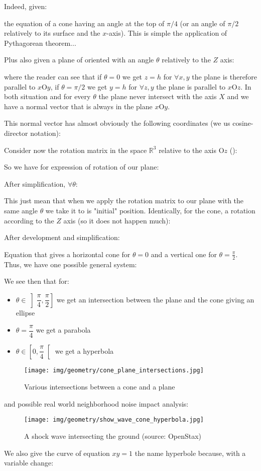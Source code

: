 \begin{enumerate}
		Indeed, given:		 
				
		the equation of a cone having an angle at the top of $\pi/4$ (or an angle of $\pi/2$ relatively to its surface and the $x$-axis). This is simple the application of Pythagorean theorem...
		
		Plus also given a plane of oriented with an angle $\theta$ relatively to the $Z$ axis:
		
		where the reader can see that if $\theta=0$ we get $z=h$ for $\forall x,y$ the plane is therefore parallel to $x\text{O}y$, if $\theta=\pi/2$ we get $y=h$ for $\forall z,y$ the plane is parallel to $x\text{O}z$. In both situation and for every $\theta$ the plane never intersect with the axis $X$ and we have a normal vector that is always in the plane $x\text{O}y$.
		
		This normal vector has almost obviously the following coordinates (we us cosine-director notation):
		
		Consider now the rotation matrix in the space $\mathbb{R}^3$ relative to the axis $\text{O}z$ ():
		
		So we have for expression of rotation of our plane:
		
		After simplification, $\forall \theta$:
		
		This just mean that when we apply the rotation matrix to our plane with the same angle $\theta$ we take it to is "initial" position.
		Identically, for the cone, a rotation according to the $Z$ axis (so it does not happen much):
		
		After development and simplification:
		
		Equation that gives a horizontal cone for $\theta=0$ and a vertical one for $\theta=\frac{\pi}{2}$.
		Thus, we have one possible general system:
		
		We see then that for:
		\begin{itemize}
			\item $\theta \in \left]\dfrac{\pi}{4},\dfrac{\pi}{2}\right]$ we get an intersection between the plane and the cone giving an ellipse
			\item $\theta=\dfrac{\pi}{4}$ we get a parabola
			\item $\theta \in \left[0,\dfrac{\pi}{4}\right[$ we get a hyperbola
		\end{itemize}
		\begin{figure}[H]
			\centering
			\texttt{[image: img/geometry/cone\_plane\_intersections.jpg]}
			\caption{Various intersections between a cone and a plane}
		\end{figure}
		and possible real world neighborhood noise impact analysis:
		\begin{figure}[H]
			\centering
			\texttt{[image: img/geometry/show\_wave\_cone\_hyperbola.jpg]}
			\caption[A shock wave intersecting the ground]{A shock wave intersecting the ground (source: OpenStax)}
		\end{figure}
		\begin{tcolorbox}[title=Remark,colframe=black,arc=10pt]
		We also give the curve of equation $xy=1$ the name hyperbole because, with a variable change:
		

\end{tcolorbox}
\end{enumerate}
